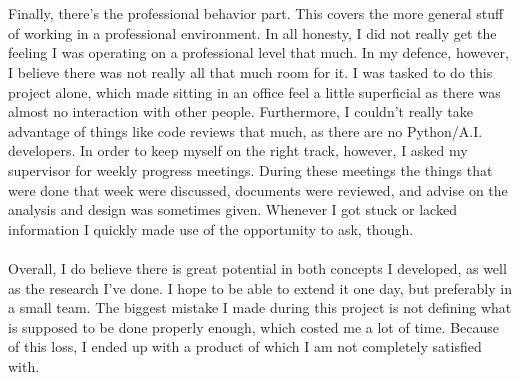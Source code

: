 \\\\
Finally, there's the professional behavior part. This covers the more general stuff of working in a professional environment. In all honesty, I did not really get the feeling I was operating on a professional level that much. In my defence, however, I believe there was not really all that much room for it. I was tasked to do this project alone, which made sitting in an office feel a little superficial as there was almost no interaction with other people. Furthermore, I couldn't really take advantage of things like code reviews that much, as there are no Python/A.I. developers. In order to keep myself on the right track, however, I asked my supervisor for weekly progress meetings. During these meetings the things that were done that week were discussed, documents were reviewed, and advise on the analysis and design was sometimes given. Whenever I got stuck or lacked information I quickly made use of the opportunity to ask, though.
\\\\
Overall, I do believe there is great potential in both concepts I developed, as well as the research I've done. I hope to be able to extend it one day, but preferably in a small team. The biggest mistake I made during this project is not defining what is supposed to be done properly enough, which costed me a lot of time. Because of this loss, I ended up with a product of which I am not completely satisfied with.

          
